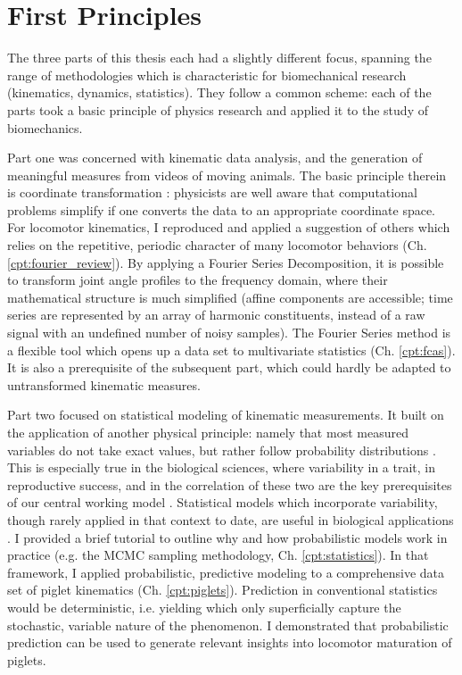 \section{First Principles}
\label{sec:org6a628ce}
The three parts of this thesis each had a slightly different focus, spanning the range of methodologies which is characteristic for biomechanical research (kinematics, dynamics, statistics).
They follow a common scheme:
each of the parts took a basic principle of physics research and applied it to the study of biomechanics.


Part one was concerned with kinematic data analysis, and the generation of meaningful measures from videos of moving animals.
The basic principle therein is coordinate transformation \citep{Tipler2007}: physicists are well aware that computational problems simplify if one converts the data to an appropriate coordinate space.
For locomotor kinematics, I reproduced and applied a suggestion of others \citep{Bernstein1927a,Webb2007} which relies on the repetitive, periodic character of many locomotor behaviors (Ch. \ref{cpt:fourier_review}).
By applying a Fourier Series Decomposition, it is possible to transform joint angle profiles to the frequency domain, where their mathematical structure is much simplified (affine components are accessible; time series are represented by an array of harmonic constituents, instead of a raw signal with an undefined number of noisy samples).
The Fourier Series method is a flexible tool which opens up a data set to multivariate statistics (Ch. \ref{cpt:fcas}).
It is also a prerequisite of the subsequent part, which could hardly be adapted to untransformed kinematic measures.

\medskip
Part two focused on statistical modeling of kinematic measurements.
It built on the application of another physical principle: namely that most measured variables do not take exact values, but rather follow probability distributions \citep{2022Probability}.
This is especially true in the biological sciences, where variability in a trait, in reproductive success, and in the correlation of these two are the key prerequisites of our central working model \citep{Darwin1859}.
Statistical models which incorporate variability, though rarely applied in that context to date, are useful in biological applications \citep{Roraas2019,DeGroote2021}.
I provided a brief tutorial to outline why and how probabilistic models work in practice (e.g. the MCMC sampling methodology, Ch. \ref{cpt:statistics}).
In that framework, I applied probabilistic, predictive modeling to a comprehensive data set of piglet kinematics (Ch. \ref{cpt:piglets}).
Prediction in conventional statistics would be deterministic, i.e. yielding  which only superficially capture the stochastic, variable nature of the phenomenon.
I demonstrated that probabilistic prediction can be used to generate relevant insights into locomotor maturation of piglets.

